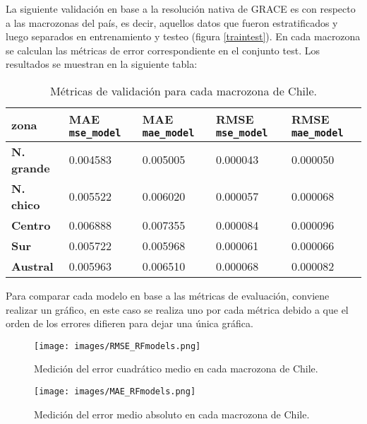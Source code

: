 La siguiente validación en base a la resolución nativa de GRACE es con respecto a las macrozonas del país, es decir, aquellos datos que fueron estratificados y luego separados en entrenamiento y testeo (figura \ref{traintest}).
En cada macrozona se calculan las métricas de error correspondiente en el conjunto test. Los resultados se muestran en la siguiente tabla:

    \begin{table}[H] 
        \caption[Métricas de validación para cada macrozona]{Métricas de validación para cada macrozona de Chile.}
        \begin{tabularx}{0.9\textwidth}{CCCCC}
        \toprule
        \textbf{zona}	& \textbf{MAE \texttt{mse\_model}}	& \textbf{MAE \texttt{mae\_model}} & \textbf{RMSE \texttt{mse\_model}} & \textbf{RMSE \texttt{mae\_model}}\\
            \midrule
            \textbf{N. grande}		& 0.004583 & 0.005005 & 0.000043 & 0.000050\\
            \textbf{N. chico}		    & 0.005522 & 0.006020 & 0.000057 & 0.000068\\
            \textbf{Centro}             & 0.006888 & 0.007355 & 0.000084 & 0.000096\\
            \textbf{Sur}                 & 0.005722 & 0.005968 & 0.000061 & 0.000066\\
            \textbf{Austral}            & 0.005963 & 0.006510 & 0.000068 & 0.000082\\
            \bottomrule
        \end{tabularx}
    \end{table}

Para comparar cada modelo en base a las métricas de evaluación, conviene realizar un gráfico, en este caso se realiza uno por cada métrica debido a que el orden de los errores
difieren para dejar una única gráfica. 

\begin{figure}[H]
    \centering
          \texttt{[image: images/RMSE\_RFmodels.png]}
          \vskip -0.1in
    \caption[Error cuadrático medio en cada macrozona del país]{\footnotesize Medición del error cuadrático medio en cada macrozona de Chile.}
    \label{mserf}
\end{figure}

\begin{figure}[H]
    \centering
          \texttt{[image: images/MAE\_RFmodels.png]}
          \vskip -0.1in
    \caption[Error medio absoluto en cada macrozona del país]{\footnotesize Medición del error medio absoluto en cada macrozona de Chile.}
    \label{maerf}
\end{figure}

